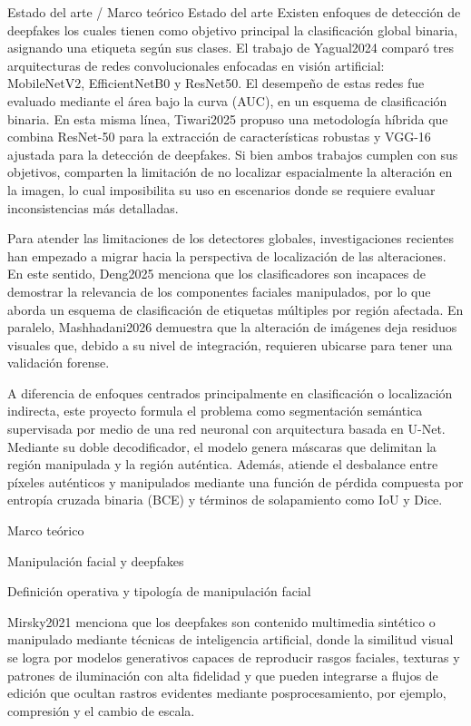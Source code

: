 Estado del arte / Marco teórico
Estado del arte
Existen enfoques de detección de deepfakes los cuales tienen como objetivo principal la clasificación global binaria, asignando una etiqueta según sus clases. El trabajo de Yagual2024 comparó tres arquitecturas de redes convolucionales enfocadas en visión artificial: MobileNetV2, EfficientNetB0 y ResNet50. El desempeño de estas redes fue evaluado mediante el área bajo la curva (AUC), en un esquema de clasificación binaria. En esta misma línea, Tiwari2025 propuso una metodología híbrida que combina ResNet-50 para la extracción de características robustas y VGG-16 ajustada para la detección de deepfakes. Si bien ambos trabajos cumplen con sus objetivos, comparten la limitación de no localizar espacialmente la alteración en la imagen, lo cual imposibilita su uso en escenarios donde se requiere evaluar inconsistencias más detalladas.

Para atender las limitaciones de los detectores globales, investigaciones recientes han empezado a migrar hacia la perspectiva de localización de las alteraciones. En este sentido, Deng2025 menciona que los clasificadores son incapaces de demostrar la relevancia de los componentes faciales manipulados, por lo que aborda un esquema de clasificación de etiquetas múltiples por región afectada. En paralelo, Mashhadani2026 demuestra que la alteración de imágenes deja residuos visuales que, debido a su nivel de integración, requieren ubicarse para tener una validación forense.

A diferencia de enfoques centrados principalmente en clasificación o localización indirecta, este proyecto formula el problema como segmentación semántica supervisada por medio de una red neuronal con arquitectura basada en U-Net. Mediante su doble decodificador, el modelo genera máscaras que delimitan la región manipulada y la región auténtica. Además, atiende el desbalance entre píxeles auténticos y manipulados mediante una función de pérdida compuesta por entropía cruzada binaria (BCE) y términos de solapamiento como IoU y Dice.

Marco teórico

Manipulación facial y deepfakes

Definición operativa y tipología de manipulación facial

Mirsky2021 menciona que los deepfakes son contenido multimedia sintético o manipulado mediante técnicas de inteligencia artificial, donde la similitud visual se logra por modelos generativos capaces de reproducir rasgos faciales, texturas y patrones de iluminación con alta fidelidad y que pueden integrarse a flujos de edición que ocultan rastros evidentes mediante posprocesamiento, por ejemplo, compresión y el cambio de escala.

